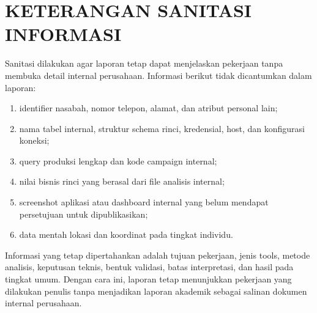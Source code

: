\cleardoublepage
\chapter{KETERANGAN SANITASI INFORMASI}
Sanitasi dilakukan agar laporan tetap dapat menjelaskan pekerjaan tanpa membuka detail internal perusahaan. Informasi berikut tidak dicantumkan dalam laporan:
\begin{enumerate}
\item identifier nasabah, nomor telepon, alamat, dan atribut personal lain;
\item nama tabel internal, struktur schema rinci, kredensial, host, dan konfigurasi koneksi;
\item query produksi lengkap dan kode campaign internal;
\item nilai bisnis rinci yang berasal dari file analisis internal;
\item screenshot aplikasi atau dashboard internal yang belum mendapat persetujuan untuk dipublikasikan;
\item data mentah lokasi dan koordinat pada tingkat individu.
\end{enumerate}
Informasi yang tetap dipertahankan adalah tujuan pekerjaan, jenis tools, metode analisis, keputusan teknis, bentuk validasi, batas interpretasi, dan hasil pada tingkat umum. Dengan cara ini, laporan tetap menunjukkan pekerjaan yang dilakukan penulis tanpa menjadikan laporan akademik sebagai salinan dokumen internal perusahaan.
